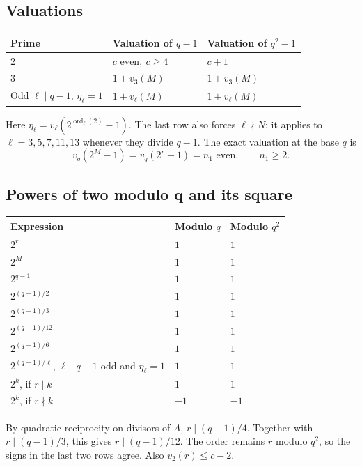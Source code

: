 \documentclass[11pt]{article}
\begin{document}
\subsection{Valuations}
{\small\renewcommand{\arraystretch}{1.2}\noindent
\begin{tabular}{@{}p{}p{}p{}@{}}
\textbf{Prime}&\textbf{Valuation of $q-1$}&\textbf{Valuation of $q^2-1$}\\\hline
$2$&$c\text{ even},\ c\ge4$&$c+1$\\
$3$&$1+v_3(M)$&$1+v_3(M)$\\
Odd $\ell\mid q-1$, $\eta_\ell=1$&$1+v_\ell(M)$&$1+v_\ell(M)$\\\hline
\end{tabular}\par}
\medskip\noindent
Here $\eta_\ell=v_\ell(2^{\operatorname{ord}_\ell(2)}-1)$.
The last row also forces $\ell\nmid N$; it applies to
$\ell=3,5,7,11,13$ whenever they divide $q-1$.
The exact valuation at the base $q$ is
\[
v_q(2^M-1)=v_q(2^r-1)=n_1\text{ even},\qquad n_1\ge2.
\]

\clearpage
\subsection{Powers of two modulo q and its square}
{\small\renewcommand{\arraystretch}{1.2}
\begin{longtable}{@{}p{}p{}p{}@{}}
\textbf{Expression}&\textbf{Modulo $q$}&\textbf{Modulo $q^2$}\\\hline
\endhead
$2^r$&$1$&$1$\\
$2^M$&$1$&$1$\\
$2^{q-1}$&$1$&$1$\\
$2^{(q-1)/2}$&$1$&$1$\\
$2^{(q-1)/3}$&$1$&$1$\\
$2^{(q-1)/12}$&$1$&$1$\\
$2^{(q-1)/6}$&$1$&$1$\\
$2^{(q-1)/\ell}$, $\ell\mid q-1$ odd and $\eta_\ell=1$&$1$&$1$\\
$2^k$, if $r\mid k$&$1$&$1$\\
$2^k$, if $r\nmid k$&$-1$&$-1$\\\hline
\end{longtable}}
By quadratic reciprocity on divisors of $A$, $r\mid(q-1)/4$.
Together with $r\mid(q-1)/3$, this gives $r\mid(q-1)/12$.
The order remains $r$ modulo $q^2$, so the signs in the last two
rows agree. Also $v_2(r)\le c-2$.
\end{document}
